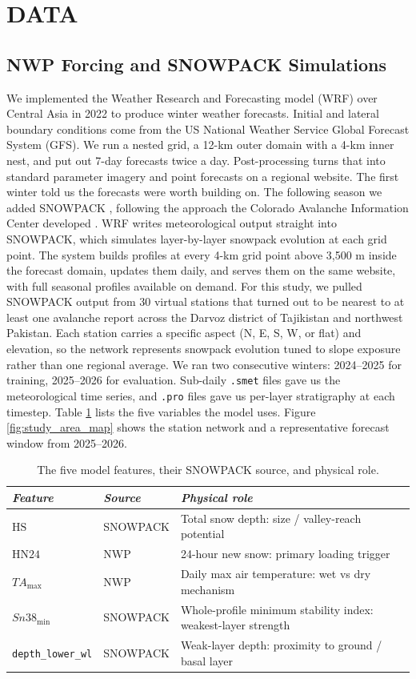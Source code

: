 \documentclass{issw}
\newcommand{\HS}{\mathrm{HS}}
\newcommand{\HNtf}{\mathrm{HN24}}
\newcommand{\TAmax}{TA_{\mathrm{max}}}
\newcommand{\Snmin}{Sn38_{\mathrm{min}}}
\newcommand{\dlwl}{\texttt{depth\_lower\_wl}}
\begin{document}
\section{DATA}
\subsection{NWP Forcing and SNOWPACK Simulations}
We implemented the Weather Research and Forecasting model (WRF) \parencite{SkamarockKlemp2008} over Central Asia in 2022 to produce winter weather forecasts. Initial and lateral boundary conditions come from the US National Weather Service Global Forecast System (GFS). We run a nested grid, a 12-km outer domain with a 4-km inner nest, and put out 7-day forecasts twice a day. Post-processing turns that into standard parameter imagery and point forecasts on a regional website. The first winter told us the forecasts were worth building on.
The following season we added SNOWPACK \parencite{Lehning2002,Morin2020}, following the approach the Colorado Avalanche Information Center developed \parencite{SnookEtAl2022,Snook2016}. WRF writes meteorological output straight into SNOWPACK, which simulates layer-by-layer snowpack evolution at each grid point. The system builds profiles at every 4-km grid point above 3,500 m inside the forecast domain, updates them daily, and serves them on the same website, with full seasonal profiles available on demand.
For this study, we pulled SNOWPACK output from 30 virtual stations that turned out to be nearest to at least one avalanche report across the Darvoz district of Tajikistan and northwest Pakistan. Each station carries a specific aspect (N, E, S, W, or flat) and elevation, so the network represents snowpack evolution tuned to slope exposure rather than one regional average. We ran two consecutive winters: 2024–2025 for training, 2025–2026 for evaluation. Sub-daily {\texttt{.smet}} files gave us the meteorological time series, and {\texttt{.pro}} files gave us per-layer stratigraphy at each timestep. Table \ref{tab:table_1} lists the five variables the model uses. Figure \ref{fig:study_area_map} shows the station network and a representative forecast window from 2025–2026.

\begin{table}[t]
  \centering
  \caption{The five model features, their SNOWPACK source, and physical role.}
  \label{tab:table_1}
  \begin{tabular}{lll}
    \hline
    \textbf{\textit{Feature}} & \textbf{\textit{Source}} & \textbf{\textit{Physical role}} \\
    \hline
    $\HS$ & SNOWPACK & Total snow depth: size / valley-reach potential \\
    $\HNtf$ & NWP & 24-hour new snow: primary loading trigger \\
    $\TAmax$ & NWP & Daily max air temperature: wet vs dry mechanism \\
    $\Snmin$ & SNOWPACK & Whole-profile minimum stability index: weakest-layer strength \\
    \dlwl & SNOWPACK & Weak-layer depth: proximity to ground / basal layer \\
    \hline
  \end{tabular}
\end{table}
\end{document}

